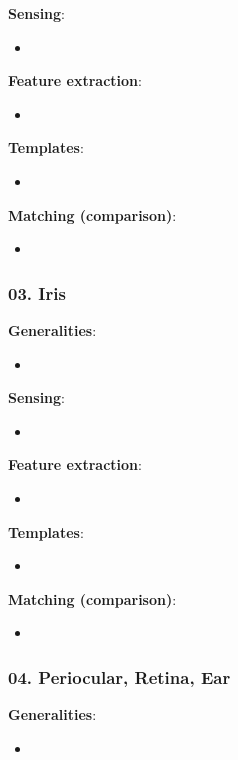 \documentclass[a4paper]{article}
\begin{document}
      \textbf{Sensing}:
      \begin{itemize}
        \item 
      \end{itemize}

      \textbf{Feature extraction}:
      \begin{itemize}
        \item 
      \end{itemize}

      \textbf{Templates}:
      \begin{itemize}
        \item 
      \end{itemize}

      \textbf{Matching (comparison)}:
      \begin{itemize}
        \item 
      \end{itemize}
    \subsubsection*{03. Iris}
      \textbf{Generalities}:
      \begin{itemize}
        \item 
      \end{itemize}

      \textbf{Sensing}:
      \begin{itemize}
        \item 
      \end{itemize}

      \textbf{Feature extraction}:
      \begin{itemize}
        \item 
      \end{itemize}

      \textbf{Templates}:
      \begin{itemize}
        \item 
      \end{itemize}

      \textbf{Matching (comparison)}:
      \begin{itemize}
        \item 
      \end{itemize}
    \subsubsection*{04. Periocular, Retina, Ear}
      \textbf{Generalities}:
      \begin{itemize}
        \item 
      \end{itemize}
\end{document}
